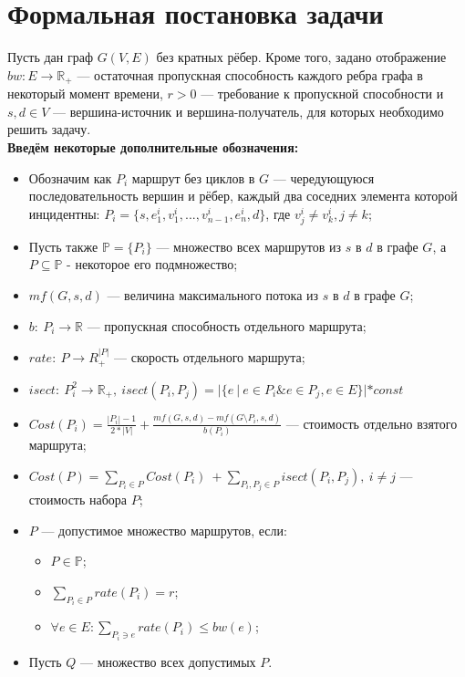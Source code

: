 \documentclass[a4paper]{article}
\begin{document}
\section{Формальная постановка задачи}
Пусть дан граф $G(V, E)$ без кратных рёбер. Кроме того, задано отображение $bw: E \to \mathbb{R}_+$ --- остаточная пропускная способность каждого ребра графа в некоторый момент времени, $r>0$ --- требование к пропускной способности и $s, d \in V$ --- вершина-источник и вершина-получатель, для которых необходимо решить задачу.\\
\textbf{Введём некоторые дополнительные обозначения:}
\begin{itemize}

\item Обозначим как $P_i$ маршрут без циклов в $G$ --- чередующуюся последовательность вершин и рёбер, каждый два соседних элемента которой инцидентны: $P_i = \{s, e^i_1, v^i_1, ..., v^i_{n-1}, e^i_n, d\}$, где $v^i_j \ne v^i_k, j \ne k$;

\item Пусть также $\mathbb{P} = \{P_i\}$ --- множество всех маршрутов из $s$ в $d$ в графе $G$, а $P \subseteq \mathbb{P}$ - некоторое его подмножество;

\item $mf(G, s, d)$ --- величина максимального потока из $s$ в $d$ в графе $G$;
\item $b:\ P_i \to \mathbb{R}$ --- пропускная способность отдельного маршрута;

\item $rate:\  P \to R^{|P|}_+$ --- скорость отдельного маршрута;

\item $isect:\ P_i^2 \to \mathbb{R}_+,\ isect(P_i, P_j) = |\{e\ |\ e \in P_i \& e \in P_j, e \in E\}|*const$

\item $Cost(P_i) = \frac{|P_i| - 1}{2*|V|} + \frac{mf(G, s, d) - mf(G \setminus P_i, s, d)}{b(P_i)}$ --- стоимость отдельно взятого маршрута;

\item $Cost(P) = \sum\limits_{P_i\in P} Cost(P_i)\ + \sum\limits_{P_i, P_j \in P} isect(P_i, P_j),\ i \ne j$ --- стоимость набора $P$;

\item $P$ --- допустимое множество маршрутов, если:
\begin{itemize}
\item $P\in \mathbb{P}$;
\item $\sum\limits_{P_i\in P} rate(P_i) = r$;
\item $\forall e \in E: \sum\limits_{P_i \ni e} rate(P_i) \le bw(e)$;
\end{itemize}
\item Пусть $Q$ --- множество всех допустимых $P$.
\end{itemize}
\end{document}
